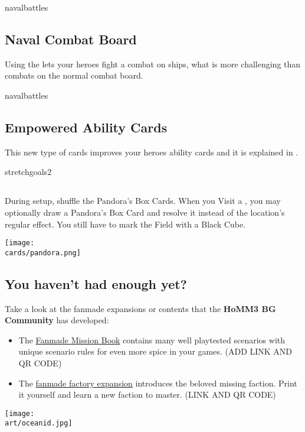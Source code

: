 \begin{multicols*}{2}
\begin{expansion}{navalbattles}
  \subsection*{Naval Combat Board}
  Using the  lets your heroes fight a combat on ships, what is more challenging than combats on the normal combat board.
\end{expansion}

\vspace*{1em}
\begin{expansion}{navalbattles}
  \subsection*{Empowered Ability Cards}
  This new type of cards improves your heroes ability cards and it is explained in .
\end{expansion}

\begin{expansion}{stretchgoals2}
  \subsection*{}
  During setup, shuffle the Pandora's Box Cards.
  When you Visit a , you may optionally draw a Pandora's Box Card and resolve it instead of the location's regular effect.
  You still have to mark the Field with a Black Cube.

  \medskip
  \begin{center}
    \texttt{[image: \\cards/pandora.png]}
  \end{center}
\end{expansion}

\vspace*{1em}
\subsection*{You haven't had enough yet?}
Take a look at the fanmade expansions or contents that the \textbf{HoMM3 BG Community} has developed:
  \begin{itemize}
    \item The \href{https://github.com/qwrtln/Homm3BG-mission-book}{Fanmade Mission Book} contains many well playtested scenarios with unique scenario rules for even more spice in your games. (ADD LINK AND QR CODE)
	\item The \href{https://github.com/piotrbruzda/Homm3BG-FactoryRulebook}{fanmade factory expansion} introduces the beloved missing faction. Print it yourself and learn a new faction to master. (LINK AND QR CODE)
  \end{itemize}



\columnbreak

\texttt{[image: \\art/oceanid.jpg]}

\end{multicols*}
